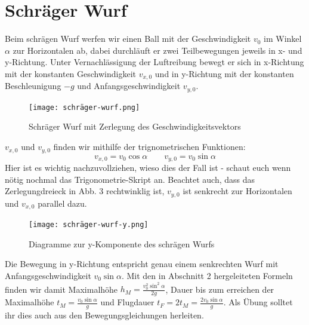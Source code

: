\documentclass[11pt]{article}
\begin{document}
\section{Schräger Wurf}
Beim schrägen Wurf werfen wir einen Ball mit der Geschwindigkeit $v_0$ im Winkel $\alpha$ zur Horizontalen ab, dabei durchläuft er zwei Teilbewegungen jeweils in x- und y-Richtung. Unter Vernachlässigung der Luftreibung bewegt er sich in x-Richtung mit der konstanten Geschwindigkeit $v_{x, 0}$ und in y-Richtung mit der konstanten Beschleunigung $-g$ und Anfangsgeschwindigkeit $v_{y, 0}$. 
\begin{figure}[H] 
    \centering
       \texttt{[image: schräger-wurf.png]}
       \caption{Schräger Wurf mit Zerlegung des Geschwindigkeitsvektors}
\end{figure} 
$v_{x, 0}$ und $v_{y, 0}$ finden wir mithilfe der trignometrischen Funktionen: 
$$v_{x, 0} = v_0\cos\alpha \quad\quad v_{y, 0} = v_0\sin\alpha$$
Hier ist es wichtig nachzuvollziehen, wieso dies der Fall ist - schaut euch wenn nötig nochmal das Trigonometrie-Skript an. Beachtet auch, dass das Zerlegungdreieck in Abb. 3 rechtwinklig ist, $v_{y, 0}$ ist senkrecht zur Horizontalen und $v_{x, 0}$ parallel dazu. 
\begin{figure}[H] 
    \centering
       \texttt{[image: schräger-wurf-y.png]}
       \caption{Diagramme zur y-Komponente des schrägen Wurfs}
\end{figure} 
Die Bewegung in y-Richtung entspricht genau einem senkrechten Wurf mit Anfangsgeschwindigkeit $v_0\sin\alpha$. Mit den in Abschnitt 2 hergeleiteten Formeln finden wir damit Maximalhöhe $\displaystyle h_M = \frac{v_0^2\sin^2\alpha}{2g}$, Dauer bis zum erreichen der Maximalhöhe $\displaystyle t_M = \frac{v_0\sin\alpha}{g}$ und Flugdauer $\displaystyle t_F = 2t_M = \frac{2v_0\sin\alpha}{g}$. Als Übung solltet ihr dies auch aus den Bewegungsgleichungen herleiten. 
\end{document}
